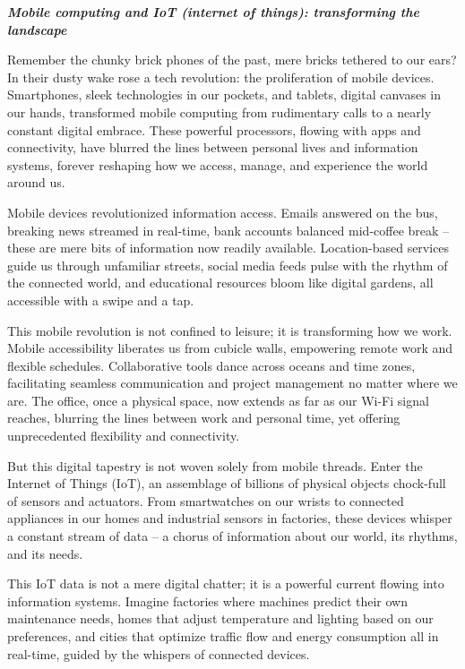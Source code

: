\documentclass[
  letterpaper,
  DIV=11,
  numbers=noendperiod]{scrreprt}
\begin{document}
\textbf{\emph{Mobile computing and IoT (internet of things):
transforming the landscape}}

Remember the chunky brick phones of the past, mere bricks tethered to
our ears? In their dusty wake rose a tech revolution: the proliferation
of mobile devices. Smartphones, sleek technologies in our pockets, and
tablets, digital canvases in our hands, transformed mobile computing
from rudimentary calls to a nearly constant digital embrace. These
powerful processors, flowing with apps and connectivity, have blurred
the lines between personal lives and information systems, forever
reshaping how we access, manage, and experience the world around us.

Mobile devices revolutionized information access. Emails answered on the
bus, breaking news streamed in real-time, bank accounts balanced
mid-coffee break -- these are mere bits of information now readily
available. Location-based services guide us through unfamiliar streets,
social media feeds pulse with the rhythm of the connected world, and
educational resources bloom like digital gardens, all accessible with a
swipe and a tap.

This mobile revolution is not confined to leisure; it is transforming
how we work. Mobile accessibility liberates us from cubicle walls,
empowering remote work and flexible schedules. Collaborative tools dance
across oceans and time zones, facilitating seamless communication and
project management no matter where we are. The office, once a physical
space, now extends as far as our Wi-Fi signal reaches, blurring the
lines between work and personal time, yet offering unprecedented
flexibility and connectivity.

But this digital tapestry is not woven solely from mobile threads. Enter
the Internet of Things (IoT), an assemblage of billions of physical
objects chock-full of sensors and actuators. From smartwatches on our
wrists to connected appliances in our homes and industrial sensors in
factories, these devices whisper a constant stream of data -- a chorus
of information about our world, its rhythms, and its needs.

This IoT data is not a mere digital chatter; it is a powerful current
flowing into information systems. Imagine factories where machines
predict their own maintenance needs, homes that adjust temperature and
lighting based on our preferences, and cities that optimize traffic flow
and energy consumption all in real-time, guided by the whispers of
connected devices.
\end{document}
